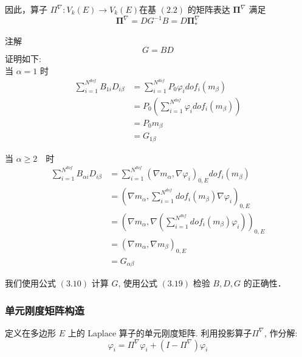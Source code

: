 因此，算子 $\Pi^{\nabla}:V_k(E) \to V_k(E)$在基 $(2.2)$ 的矩阵表达 $\boldsymbol{\Pi}^{\nabla}$ 满足 \\
\begin{equation}
\boldsymbol{\Pi}^{\nabla} = D G^{-1} B = D \boldsymbol{\Pi}_{\ast}^{\nabla}
\end{equation}

注解 \\
\begin{equation}
G = BD
\end{equation}
证明如下: \\

当 $\alpha = 1$ 时
\begin{equation*}
\begin{aligned}
\sum_{i = 1}^{N^{dof}}{B}_{1i}{D}_{i\beta} & = \sum_{i = 1}^{N^{dof}}P_0\varphi_idof_i(m_{\beta}) \\
& = P_0(\sum_{i = 1}^{N^{dof}}\varphi_idof_i(m_{\beta})) \\& = P_0m_{\beta} \\
& = G_{1\beta}
\end{aligned}
\end{equation*}

当 $\alpha \ge 2$　时 \\
\begin{equation*}
\begin{aligned}
\sum_{i = 1}^{N^{dof}}{B}_{\alpha i}{D}_{i\beta} & = \sum_{i = 1}^{N^{dof}}(\nabla m_{\alpha},\nabla \varphi_i)_{0,E}dof_i(m_{\beta}) \\
& = (\nabla m_{\alpha},\sum_{i = 1}^{N^{dof}}dof_i(m_{\beta})\nabla \varphi_i)_{0,E} \\
& = (\nabla m_{\alpha},\nabla(\sum_{i = 1}^{N^{dof}}dof_i(m_{\beta})\varphi_i))_{0,E} \\
& = (\nabla m_{\alpha},\nabla m_{\beta})_{0,E} \\
& = G_{\alpha\beta}
\end{aligned}
\end{equation*}

我们使用公式 $(3.10)$ 计算 $G$, 使用公式 $(3.19)$ 检验 $B, D, G$ 的正确性．\\
\subsubsection{单元刚度矩阵构造}

定义在多边形 $E$ 上的 Laplace 算子的单元刚度矩阵. 利用投影算子$\Pi^{\nabla}$, 作分解: \\
\begin{equation*} 
\varphi_i = \Pi^{\nabla} \varphi_i + (I-\Pi^{\nabla})\varphi_i 
\end{equation*}

